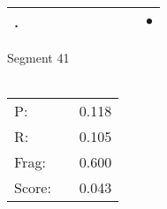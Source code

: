 \documentclass[landscape]{article}
\newcommand{\ssp}{\hspace{2pt}}
\newcommand{\mex}{\cellcolor{g}$\bullet$}
\begin{document}
\begin{tabular}{|l|p{10pt}|p{10pt}|p{10pt}|p{10pt}|p{10pt}|p{10pt}|p{10pt}|p{10pt}|p{10pt}|}
\hline
\ssp \cellcolor{ref8}. \ssp&\hspace{2pt}&\hspace{2pt}&\hspace{2pt}&\hspace{2pt}&\hspace{2pt}&\hspace{2pt}&\hspace{2pt}&\hspace{2pt}&\hspace{2pt}\mex\\
\hline
\end{tabular}

\vspace{6pt}
\noindent Segment 41\\\\
\noindent\begin{tabular}{lm{12pt}r}
\hline
P:&&0.118\\
R:&&0.105\\
Frag:&&0.600\\
Score:&&0.043\\
\end{tabular}

\newpage
\end{document}

